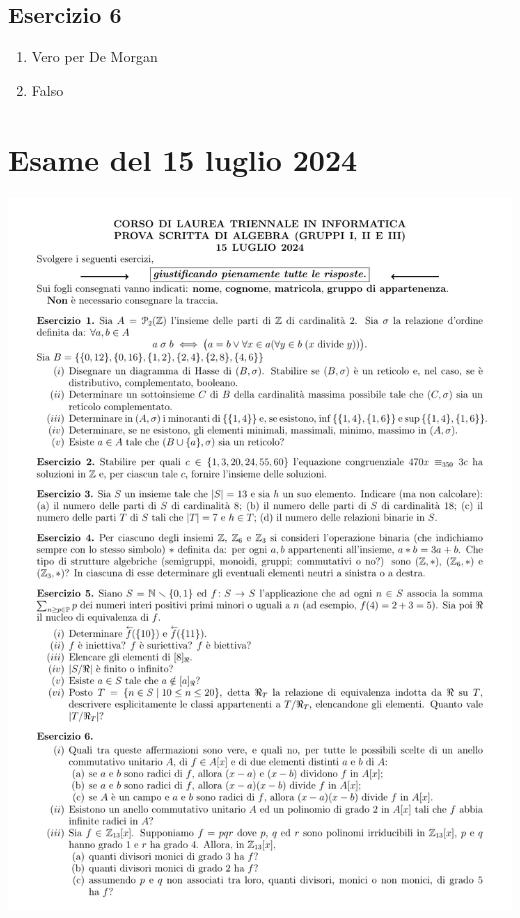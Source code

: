 \subsection*{Esercizio 6}
\begin{enumerate}[label=(\textit{\roman*})]
	\item Vero per De Morgan
	\item Falso
\end{enumerate}
\vfill

\section{Esame del 15 luglio 2024}
\begin{center}
	\includegraphics[scale=.85]{pdf/24-07-15.pdf}
\end{center}
